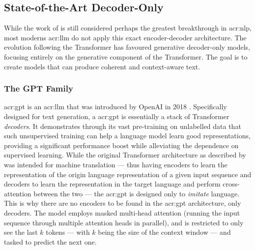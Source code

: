 \subsection[State-of-the-Art Decoder-Only LLMs]{State-of-the-Art Decoder-Only }
\label{subsec:sota-decoder-only-llms}

While the work of \citeauthor{vaswaniAttentionAllYou2017} is still considered perhaps the greatest breakthrough in \gls{acr:nlp}, most moderns \acrshort{acr:llm} do not apply this exact encoder-decoder architecture. The evolution following the Transformer has favoured generative decoder-only models, focusing entirely on the generative component of the Transformer. The goal is to create models that can produce coherent and context-aware text.

\subsubsection{The GPT Family}
\label{subusubsec:gpt}

\gls{acr:gpt} is an \acrshort{acr:llm} that was introduced by OpenAI in 2018 \citep{radfordImprovingLanguageUnderstanding2018}. Specifically designed for text generation, a \acrshort{acr:gpt} is essentially a stack of Transformer \textit{decoders}. It demonstrates through its vast pre-training on unlabelled data that such unsupervised training can help a language model learn good representations, providing a significant performance boost while alleviating the dependence on supervised learning. While the original Transformer architecture as described by \cite{vaswaniAttentionAllYou2017} was intended for machine translation --- thus having encoders to learn the representation of the origin language representation of a given input sequence and decoders to learn the representation in the target language and perform cross-attention between the two --- the \acrshort{acr:gpt} is designed only to \textit{imitate} language. This is why there are no encoders to be found in the \acrshort{acr:gpt} architecture, only decoders. The model employs masked multi-head attention (running the input sequence through multiple attention heads in parallel), and is restricted to only see the last $k$ tokens --- with $k$ being the size of the context window --- and tasked to predict the next one.

